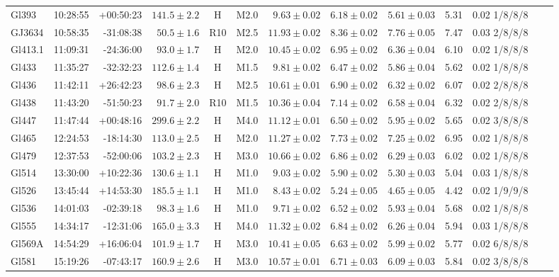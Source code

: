 \documentclass{aa}
\begin{document}
\begin{table}[h!]
{\begin{tabular}{ l r r r c c r r r r r r r}
Gl393 & 10:28:55 & +00:50:23 & $141.5 \pm  2.2$ & H & M2.0 &  $9.63 \pm 0.02$ & $6.18 \pm 0.02$ & $5.61 \pm 0.03$ & 5.31 & 0.02 1/8/8/8 \\
GJ3634 & 10:58:35 & -31:08:38 & $50.5 \pm  1.6$ & R10 & M2.5 &  $11.93 \pm 0.02$ & $8.36 \pm 0.02$ & $7.76 \pm 0.05$ & 7.47 & 0.03 2/8/8/8 \\
Gl413.1 & 11:09:31 & -24:36:00 & $93.0 \pm  1.7$ & H & M2.0 &  $10.45 \pm 0.02$ & $6.95 \pm 0.02$ & $6.36 \pm 0.04$ & 6.10 & 0.02 1/8/8/8 \\
Gl433 & 11:35:27 & -32:32:23 & $112.6 \pm  1.4$ & H & M1.5 &  $9.81 \pm 0.02$ & $6.47 \pm 0.02$ & $5.86 \pm 0.04$ & 5.62 & 0.02 1/8/8/8 \\
Gl436 & 11:42:11 & +26:42:23 & $98.6 \pm  2.3$ & H & M2.5 &  $10.61 \pm 0.01$ & $6.90 \pm 0.02$ & $6.32 \pm 0.02$ & 6.07 & 0.02 2/8/8/8 \\
Gl438 & 11:43:20 & -51:50:23 & $91.7 \pm  2.0$ & R10 & M1.5 &  $10.36 \pm 0.04$ & $7.14 \pm 0.02$ & $6.58 \pm 0.04$ & 6.32 & 0.02 2/8/8/8 \\
Gl447 & 11:47:44 & +00:48:16 & $299.6 \pm  2.2$ & H & M4.0 &  $11.12 \pm 0.01$ & $6.50 \pm 0.02$ & $5.95 \pm 0.02$ & 5.65 & 0.02 3/8/8/8 \\
Gl465 & 12:24:53 & -18:14:30 & $113.0 \pm  2.5$ & H & M2.0 &  $11.27 \pm 0.02$ & $7.73 \pm 0.02$ & $7.25 \pm 0.02$ & 6.95 & 0.02 1/8/8/8 \\
Gl479 & 12:37:53 & -52:00:06 & $103.2 \pm  2.3$ & H & M3.0 &  $10.66 \pm 0.02$ & $6.86 \pm 0.02$ & $6.29 \pm 0.03$ & 6.02 & 0.02 1/8/8/8 \\
Gl514 & 13:30:00 & +10:22:36 & $130.6 \pm  1.1$ & H & M1.0 &  $9.03 \pm 0.02$ & $5.90 \pm 0.02$ & $5.30 \pm 0.03$ & 5.04 & 0.03 1/8/8/8 \\
Gl526 & 13:45:44 & +14:53:30 & $185.5 \pm  1.1$ & H & M1.0 &  $8.43 \pm 0.02$ & $5.24 \pm 0.05$ & $4.65 \pm 0.05$ & 4.42 & 0.02 1/9/9/8 \\
Gl536 & 14:01:03 & -02:39:18 & $98.3 \pm  1.6$ & H & M1.0 &  $9.71 \pm 0.02$ & $6.52 \pm 0.02$ & $5.93 \pm 0.04$ & 5.68 & 0.02 1/8/8/8 \\
Gl555 & 14:34:17 & -12:31:06 & $165.0 \pm  3.3$ & H & M4.0 &  $11.32 \pm 0.02$ & $6.84 \pm 0.02$ & $6.26 \pm 0.04$ & 5.94 & 0.03 1/8/8/8 \\
Gl569A & 14:54:29 & +16:06:04 & $101.9 \pm  1.7$ & H & M3.0 &  $10.41 \pm 0.05$ & $6.63 \pm 0.02$ & $5.99 \pm 0.02$ & 5.77 & 0.02 6/8/8/8 \\
Gl581 & 15:19:26 & -07:43:17 & $160.9 \pm  2.6$ & H & M3.0 &  $10.57 \pm 0.01$ & $6.71 \pm 0.03$ & $6.09 \pm 0.03$ & 5.84 & 0.02 3/8/8/8 \\

\end{tabular}}
\end{table}
\end{document}
